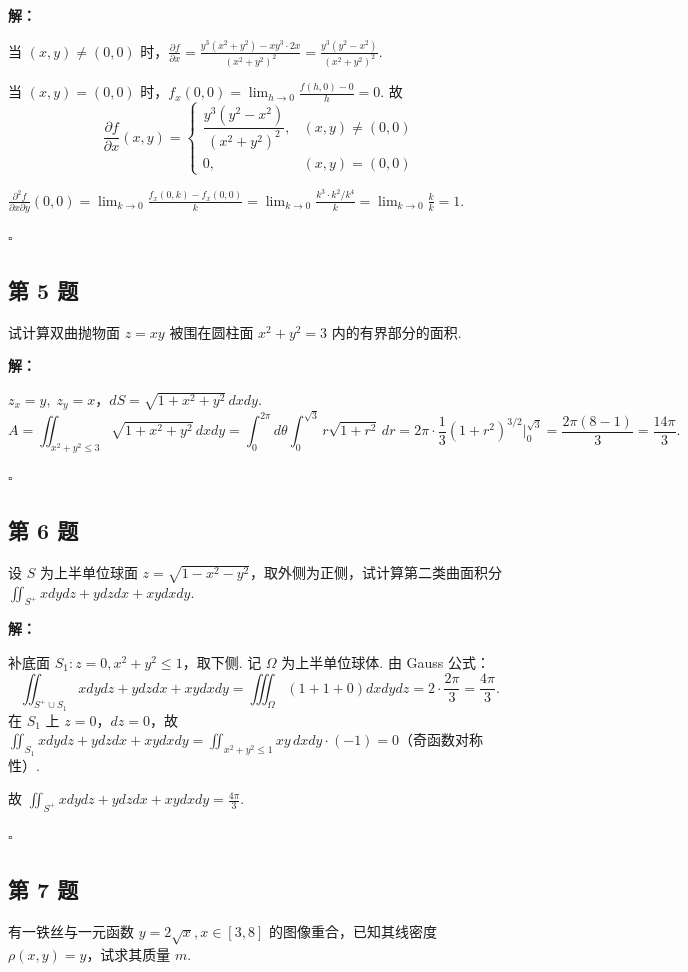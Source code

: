 \documentclass[12pt,a4paper]{article}
\newenvironment{sol}[1][解]{%
  \par\medskip\noindent\textbf{#1：}\itshape\par\noindent\ignorespaces
}{%
  \par\hfill$\square$\par\medskip
}
\begin{document}
\begin{sol}当 $(x,y)\ne(0,0)$ 时，$\frac{\partial f}{\partial
  x}=\frac{y^3(x^2+y^2)-xy^3\cdot
  2x}{(x^2+y^2)^2}=\frac{y^3(y^2-x^2)}{(x^2+y^2)^2}.$

  当 $(x,y)=(0,0)$ 时，$f_x(0,0)=\lim_{h\to 0}\frac{f(h,0)-0}{h}=0$. 故
  $$\frac{\partial f}{\partial x}(x,y)=
  \begin{cases}\dfrac{y^3(y^2-x^2)}{(x^2+y^2)^2}, & (x,y)\ne(0,0)\\ 0,
    & (x,y)=(0,0)
  \end{cases}$$

  $\frac{\partial^2 f}{\partial x\partial y}(0,0)=\lim_{k\to
  0}\frac{f_x(0,k)-f_x(0,0)}{k}=\lim_{k\to 0}\frac{k^3\cdot
  k^2/k^4}{k}=\lim_{k\to 0}\frac{k}{k}=1.$

\end{sol}
\subsection*{第 5 题}
试计算双曲抛物面 $z=xy$ 被围在圆柱面 $x^2+y^2=3$ 内的有界部分的面积.

\begin{sol}$z_x=y,\; z_y=x$，$dS=\sqrt{1+x^2+y^2}\,dxdy$.
  $$A=\iint_{x^2+y^2\le
  3}\sqrt{1+x^2+y^2}\,dxdy=\int_0^{2\pi}d\theta\int_0^{\sqrt{3}}r\sqrt{1+r^2}\,dr=2\pi\cdot\frac{1}{3}(1+r^2)^{3/2}\Big|_0^{\sqrt{3}}=\frac{2\pi(8-1)}{3}=\frac{14\pi}{3}.$$

\end{sol}
\subsection*{第 6 题}
设 $S$ 为上半单位球面 $z=\sqrt{1-x^2-y^2}$，取外侧为正侧，试计算第二类曲面积分
$\iint_{S^+}xdydz+ydzdx+xydxdy$.

\begin{sol}补底面 $S_1: z=0, x^2+y^2\le 1$，取下侧. 记 $\Omega$
  为上半单位球体. 由 Gauss 公式：
  $$\iint_{S^+\cup
  S_1}xdydz+ydzdx+xydxdy=\iiint_{\Omega}(1+1+0)dxdydz=2\cdot\frac{2\pi}{3}=\frac{4\pi}{3}.$$
  在 $S_1$ 上 $z=0$，$dz=0$，故
  $\iint_{S_1}xdydz+ydzdx+xydxdy=\iint_{x^2+y^2\le
  1}xy\,dxdy\cdot(-1)=0$（奇函数对称性）.

  故 $\iint_{S^+}xdydz+ydzdx+xydxdy=\frac{4\pi}{3}$.

\end{sol}
\subsection*{第 7 题}
有一铁丝与一元函数 $y=2\sqrt{x}, x\in[3,8]$ 的图像重合，已知其线密度 $\rho(x,y) = y$，试求其质量 $m$.
\end{document}
